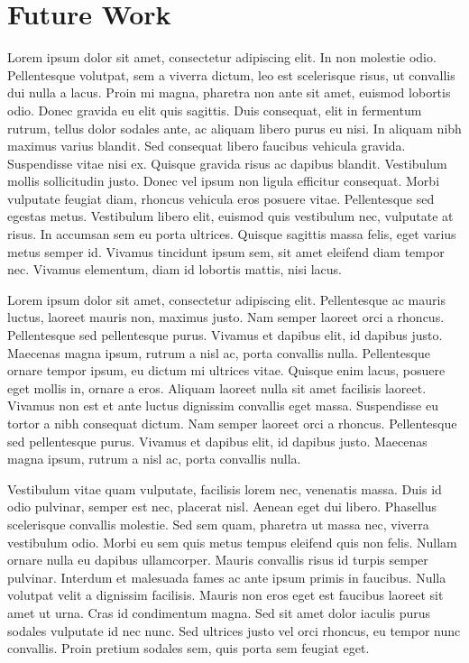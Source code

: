 \chapter{Future Work}
Lorem ipsum dolor sit amet, consectetur adipiscing elit. In non molestie odio. Pellentesque volutpat, sem a viverra dictum, leo est scelerisque risus, ut convallis dui nulla a lacus. Proin mi magna, pharetra non ante sit amet, euismod lobortis odio. Donec gravida eu elit quis sagittis. Duis consequat, elit in fermentum rutrum, tellus dolor sodales ante, ac aliquam libero purus eu nisi. In aliquam nibh maximus varius blandit. Sed consequat libero faucibus vehicula gravida. Suspendisse vitae nisi ex. Quisque gravida risus ac dapibus blandit. Vestibulum mollis sollicitudin justo. Donec vel ipsum non ligula efficitur consequat. Morbi vulputate feugiat diam, rhoncus vehicula eros posuere vitae. Pellentesque sed egestas metus. Vestibulum libero elit, euismod quis vestibulum nec, vulputate at risus. In accumsan sem eu porta ultrices. Quisque sagittis massa felis, eget varius metus semper id. Vivamus tincidunt ipsum sem, sit amet eleifend diam tempor nec. Vivamus elementum, diam id lobortis mattis, nisi lacus.

Lorem ipsum dolor sit amet, consectetur adipiscing elit. Pellentesque ac mauris luctus, laoreet mauris non, maximus justo. Nam semper laoreet orci a rhoncus. Pellentesque sed pellentesque purus. Vivamus et dapibus elit, id dapibus justo. Maecenas magna ipsum, rutrum a nisl ac, porta convallis nulla. Pellentesque ornare tempor ipsum, eu dictum mi ultrices vitae. Quisque enim lacus, posuere eget mollis in, ornare a eros. Aliquam laoreet nulla sit amet facilisis laoreet. Vivamus non est et ante luctus dignissim convallis eget massa. Suspendisse eu tortor a nibh consequat dictum. Nam semper laoreet orci a rhoncus. Pellentesque sed pellentesque purus. Vivamus et dapibus elit, id dapibus justo. Maecenas magna ipsum, rutrum a nisl ac, porta convallis nulla.

Vestibulum vitae quam vulputate, facilisis lorem nec, venenatis massa. Duis id odio pulvinar, semper est nec, placerat nisl. Aenean eget dui libero. Phasellus scelerisque convallis molestie. Sed sem quam, pharetra ut massa nec, viverra vestibulum odio. Morbi eu sem quis metus tempus eleifend quis non felis. Nullam ornare nulla eu dapibus ullamcorper. Mauris convallis risus id turpis semper pulvinar. Interdum et malesuada fames ac ante ipsum primis in faucibus. Nulla volutpat velit a dignissim facilisis. Mauris non eros eget est faucibus laoreet sit amet ut urna. Cras id condimentum magna. Sed sit amet dolor iaculis purus sodales vulputate id nec nunc. Sed ultrices justo vel orci rhoncus, eu tempor nunc convallis. Proin pretium sodales sem, quis porta sem feugiat eget.

